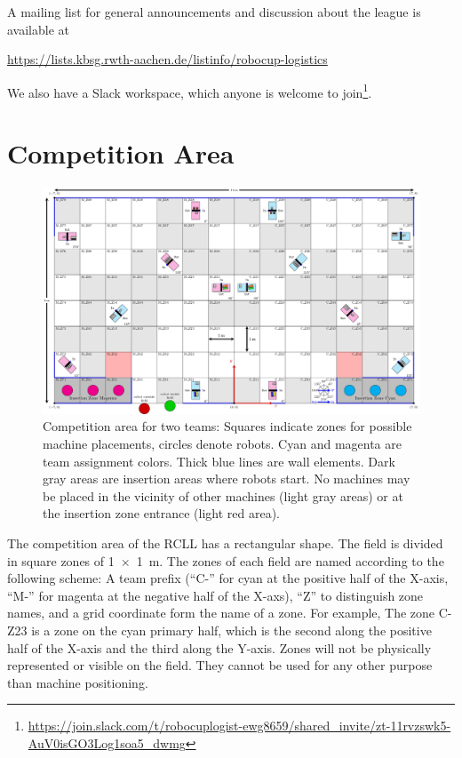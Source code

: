 \documentclass[12pt,twoside]{article}
\begin{document}
\smallskip
\noindent
A mailing list for general announcements and discussion about the
league is available at\\
\centerline{\url{https://lists.kbsg.rwth-aachen.de/listinfo/robocup-logistics}}

\smallskip
\noindent
We also have a Slack workspace, which anyone is welcome to
join\footnote{{\url{https://join.slack.com/t/robocuplogist-ewg8659/shared_invite/zt-11rvzswk5-AuV0isGO3Log1soa5_dwmg}}}. %

\section{Competition Area} \label{sec:area}
\begin{figure}[p]
    \includegraphics[width=\paperwidth, angle=-90, trim=0 0 0 0,]{field2022.pdf}
    \vspace{1ex}
    \caption{%
      Competition area for two teams: Squares indicate zones for possible
      machine placements, circles denote robots. Cyan and magenta are
      team assignment colors. Thick blue lines are wall elements.
      Dark gray areas are insertion areas where robots start. No machines may
      be placed in the vicinity of other machines (light gray areas) or at
      the insertion zone entrance (light red area).
    }
    \label{fig:competition-area}
\end{figure}
The competition area of the \ac{RCLL} has a rectangular shape. The field is
divided in square zones of \SI{1 x 1}{\metre}. %
The zones of each field are named according to the following scheme:
A team prefix (``C-'' for cyan at the positive half of the X-axis, ``M-'' for
magenta at the negative half of the X-axs), ``Z'' to distinguish zone names,
and a grid coordinate form the name of a zone.
For example, The zone C-Z23 is a zone on the cyan primary half, which is
the second along the positive half of the X-axis and the third along the Y-axis.
Zones will not be physically represented or visible on the field.
They cannot be used for any other purpose than machine positioning.
\end{document}
